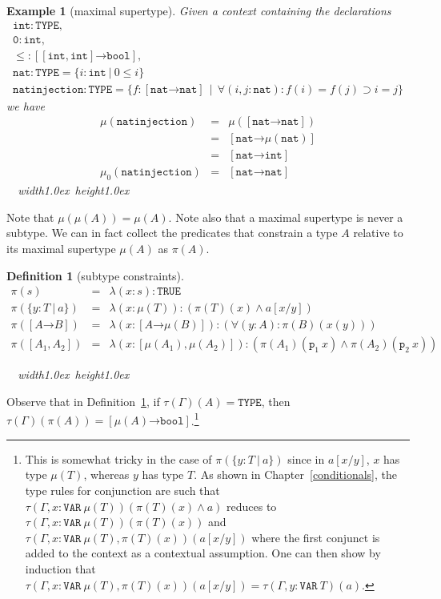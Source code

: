 \documentclass [12pt,twoside]{cslreport}
\newcommand{\thmbox}
   {{\ \hfill\hbox{%
      \vrule width1.0ex height1.0ex
   }\parfillskip 0pt }}
\newtheorem{example}[thm]{Example}
\newcommand{\aro}{\mathord\rightarrow} %
\newcommand{\funtype}[2]{[#1 \aro #2]}
\newcommand{\tupletype}[1]{[#1]}
\newcommand{\tauGamma}[1]{\tau(\Gamma)(#1)}
\newcommand{\proj}[1]{\mathtt{p}_{#1}}
\newcommand{\listwo}[2]{#1_{1}, #1_{2}}
\newcommand{\ttbool}{\mathtt{bool}}
\newcommand{\tttrue}{\mathtt{TRUE}}
\newcommand{\tttype}{\mathtt{TYPE}}
\newcommand{\ttvar}{\mathtt{VAR}}
\newcommand{\ttint}{\mathtt{int}}
\newcommand{\ttnat}{\mathtt{nat}}
\newcommand{\vbar}{\ |\ }
\newenvironment{Eg}[1]{\begin{example}[#1]\label{eg:#1}\em }{\thmbox\end{example}}
\newtheorem{definition}{Definition}
\newenvironment{Defn}[1]{\begin{definition}[#1]\label{defn:#1}}{
\thmbox\end{definition}}
\begin{document}
\begin{Eg}{maximal supertype}
Given a context containing the declarations
$$\begin{array}{l}
  \ttint : \tttype, \\
  \mathtt{0} : \ttint,\\
  \leq : \funtype{\tupletype{\ttint, \ttint}}{\ttbool},\\
  \ttnat : \tttype = \{ i : \ttint \vbar  0 \leq i\}\\
  \mathtt{natinjection} : \tttype = \{ f : \funtype{\ttnat}{\ttnat}\ \vbar\ 
\forall (i, j: \ttnat): f(i) = f(j) \supset i = j \}
\end{array}$$
we have
\begin{eqnarray*}
  \mu(\mathtt{natinjection}) & = & \mu(\funtype{\ttnat}{\ttnat})\\
 &=  & \funtype{\ttnat}{\mu(\ttnat)}\\
 &=  & \funtype{\ttnat}{\ttint}\\
\mu_0(\mathtt{natinjection}) & = & \funtype{\ttnat}{\ttnat}
\end{eqnarray*}
\end{Eg}

Note that   $\mu(\mu(A)) = \mu(A)$.
Note also that a maximal supertype is never a subtype.  
We can in fact collect the predicates that constrain a type $A$
relative to its maximal supertype $\mu(A)$ as $\pi(A)$\@.

\begin{Defn}{subtype constraints}
\begin{eqnarray*}
  \pi(s) & = & \lambda (x : s): \tttrue \\
   \pi(\{y : T \vbar a\}) & = &   \lambda (x : \mu(T)): (\pi(T)(x) \wedge a[x/y])\\
%
   \pi(\funtype{A}{B}) & = &   \lambda (x : \funtype{A}{\mu(B)}):
    (\forall (y: A): \pi(B)(x(y))) \\
%
\pi(\tupletype{\listwo{A}{n}}) & = &
    \lambda (x: \tupletype{\mu(A_1),  \mu(A_2)}): 
	(\pi(A_1)(\proj{1}~x)\wedge \pi(A_2)(\proj{2}~x))
\end{eqnarray*}
\end{Defn}
Observe that in Definition~\ref{defn:subtype constraints}, if $\tauGamma{A} =
\tttype$, then 
$\tauGamma{\pi(A)} = \funtype{\mu(A)}{
 \mathtt{bool}}$\@.\footnote{This is somewhat tricky in the case of
$\pi(\{y:T\vbar a\})$ since in $a[x/y]$, $x$ has type $\mu(T)$, whereas
$y$ has type $T$\@.  As shown in Chapter~\ref{conditionals}, the
type rules for conjunction are such that $\tau(\Gamma, x :
\ttvar~\mu(T))(\pi(T)(x) \wedge a)$ reduces to
$\tau(\Gamma, x : \ttvar~\mu(T))(\pi(T)(x))$ and
$\tau(\Gamma, x : \ttvar~\mu(T), \pi(T)(x))(a[x/y])$ where the first
conjunct is added to the context as a contextual assumption.
One can then show by induction that $\tau(\Gamma, x:\ttvar~\mu(T),
\pi(T)(x))(a[x/y]) = \tau(\Gamma, y: \ttvar~T)(a)$\@.  }
\end{document}
